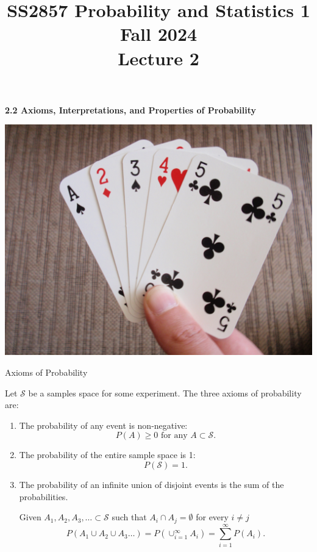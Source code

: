 \documentclass[aspectratio=169,xcolor=pdftex,dvipsnames,table]{beamer}\usepackage[]{graphicx}\usepackage[]{xcolor}
\title[SS2857 -- Lecture 2]{SS2857 Probability and Statistics 1\\
  Fall 2024\\
  \vspace{.2in}
  Lecture 2}
\date{}
\begin{document}
{

\begin{frame}
  \maketitle
\end{frame}
}


\begin{frame}
  \begin{center}
    \Large{\textbf{2.2 Axioms, Interpretations, and Properties of Probability}}

    \includegraphics[height=.6\textheight]{Figures/AcetoFive}
  \end{center}
\end{frame}

\begin{frame}{Axioms of Probability}

  Let $\mathcal S$ be a samples space for some experiment. The three axioms of probability are:
  \begin{enumerate}
  \item The probability of any event is non-negative:
    \[
      P(A) \geq 0 \mbox{ for any } A \subset \mathcal S.
    \]
  \item The probability of the entire sample space is 1:
    \[
      P(\mathcal S)=1.
    \]

  \item The probability of an infinite union of disjoint events is the sum of the probabilities. 
  
  Given $A_1,A_2,A_3,\ldots \subset \mathcal{S}$ such that $A_i\cap A_j=\emptyset$ for every $i\neq j$
    \[
      P(A_1 \cup A_2 \cup A_3\ldots)=P(\cup_{i=1}^\infty A_i)=\sum_{i=1}^\infty P(A_i).
    \]
  \end{enumerate}
  
\end{frame}
\end{document}
